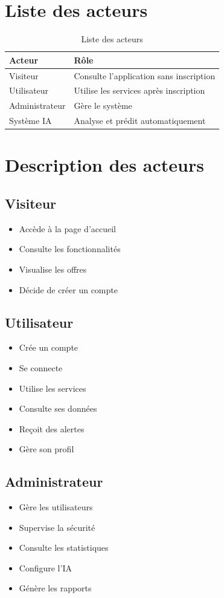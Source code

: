 \documentclass[12pt,a4paper]{report}
\begin{document}
\section{Liste des acteurs}
\begin{table}[H]
\centering
\begin{tabular}{|p{4cm}|p{9cm}|}
\hline
\textbf{Acteur} & \textbf{Rôle} \\
\hline
Visiteur & Consulte l'application sans inscription \\
\hline
Utilisateur & Utilise les services après inscription \\
\hline
Administrateur & Gère le système \\
\hline
Système IA & Analyse et prédit automatiquement \\
\hline
\end{tabular}
\caption{Liste des acteurs}
\end{table}

\section{Description des acteurs}

\subsection*{Visiteur}
\begin{itemize}[leftmargin=*,label=--]
\item Accède à la page d'accueil
\item Consulte les fonctionnalités
\item Visualise les offres
\item Décide de créer un compte
\end{itemize}

\subsection*{Utilisateur}
\begin{itemize}[leftmargin=*,label=--]
\item Crée un compte
\item Se connecte
\item Utilise les services
\item Consulte ses données
\item Reçoit des alertes
\item Gère son profil
\end{itemize}

\subsection*{Administrateur}
\begin{itemize}[leftmargin=*,label=--]
\item Gère les utilisateurs
\item Supervise la sécurité
\item Consulte les statistiques
\item Configure l'IA
\item Génère les rapports
\end{itemize}
\end{document}
